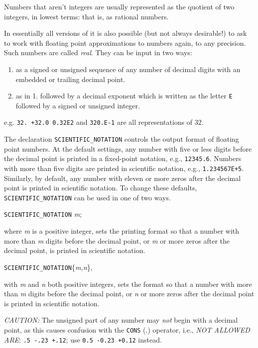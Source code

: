 Numbers that aren't integers are usually represented as the quotient of
two integers, in lowest terms: that is, as rational numbers.

In essentially all versions of {\REDUCE} it is also possible (but not always
desirable!) to ask {\REDUCE} to work with floating point approximations to
numbers again, to any precision. Such numbers are called \emph{real}.
  They can be input in two ways:
\begin{enumerate}
\item as a signed or unsigned sequence of any number of decimal digits
      with an embedded or trailing decimal point.
\item as in 1. followed by a decimal exponent which is written as the
      letter \texttt{E} followed by a signed or unsigned integer.
\end{enumerate}
e.g. \texttt{32. +32.0 0.32E2} and \texttt{320.E-1} are all representations of
32.

The declaration \texttt{SCIENTIFIC\_NOTATION}
controls the output format of floating point numbers.  At
the default settings, any number with five or less digits before the
decimal point is printed in a fixed-point notation, e.g., \texttt{12345.6}.
Numbers with more than five digits are printed in scientific notation,
e.g., \texttt{1.234567E+5}.  Similarly, by default, any number with eleven or
more zeros after the decimal point is printed in scientific notation.  To
change these defaults, \texttt{SCIENTIFIC\_NOTATION} can be used in one of two
ways.

\texttt{SCIENTIFIC\_NOTATION} \emph{m};

where \emph{m} is a positive
integer, sets the printing format so that a number with more than \emph{m}
digits before the decimal point, or \emph{m} or more zeros after the
decimal point, is printed in scientific notation. 

\texttt{SCIENTIFIC\_NOTATION}\{\emph{m,n}\},

with \emph{m} and \emph{n} both positive integers, sets the
format so that a number with more than \emph{m} digits before the decimal
point, or \emph{n} or more zeros after the decimal point is printed in
scientific notation.

\textit{CAUTION:}  The unsigned part of any number may \emph{not}
begin with a decimal point, as this causes confusion with the \texttt{CONS} (.)
operator, i.e., \emph{NOT ALLOWED ARE}: \texttt{.5  -.23  +.12};
use \texttt{0.5 -0.23 +0.12} instead.

